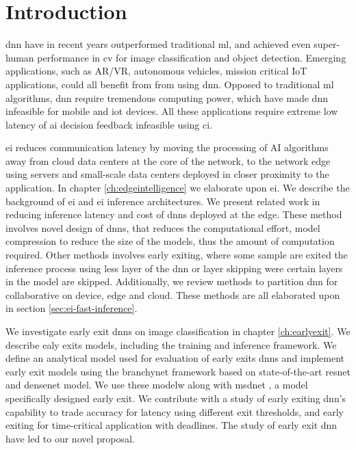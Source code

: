 \hypertarget{inroduction}{%
\chapter{Introduction}\label{ch:introduction}}
\thispagestyle{fancy}

\gls{dnn} have in recent years outperformed traditional \gls{ml}, and achieved even super-human performance in \gls{cv} for image classification and object detection. Emerging applications, such as AR/VR, autonomous vehicles, mission critical IoT applications, could all benefit from from using \gls{dnn}. Opposed to traditional \gls{ml} algorithms, \gls{dnn} require tremendous computing power, which have made \gls{dnn} infeasible for mobile and \gls{iot} devices. All these applications require extreme low latency of \gls{ai} decision feedback infeasible using \gls{ci}. 

\acrlong{ei} reduces communication latency by moving the processing of AI algorithms away from cloud data centers at the core of the network, to the network edge using servers and small-scale data centers deployed in closer proximity to the application. In chapter \ref{ch:edgeintelligence} we elaborate upon \gls{ei}. We describe the background of \gls{ei} and \gls{ei} inference architectures. We present related work in reducing inference latency and cost of \gls{dnn}s deployed at the edge. These method involves novel design of \gls{dnn}s, that reduces the computational effort, model compression to reduce the size of the models, thus the amount of computation required. Other methods involves early exiting, where some sample are exited the inference process using less layer of the \gls{dnn} or layer skipping were certain layers in the model are skipped. Additionally, we review methods to partition \gls{dnn} for collaborative on device, edge and cloud. These methods are all elaborated upon in section \ref{sec:ei-fast-inference}. 

We investigate early exit \gls{dnn}s on image classification in chapter \ref{ch:earlyexit}. We describe ealy exits models, including the training and inference framework. We define an analytical model used for evaluation of early exits \gls{dnn}s and implement early exit models using the \gls{branchynet} framework \cite{teerapittayanon_branchynet:_2016} based on state-of-the-art \gls{resnet} \cite{he_deep_2015} and \gls{densenet} \cite{huang_densely_2016} model. We use these modelw along with \gls{msdnet} \cite{huang_multi-scale_2017}, a model specifically designed early exit. We contribute with a study of early exiting \gls{dnn}'s capability to trade accuracy for latency using different exit thresholds, and early exiting for time-critical application with deadlines. The study of early exit \gls{dnn} have led to our novel proposal.

